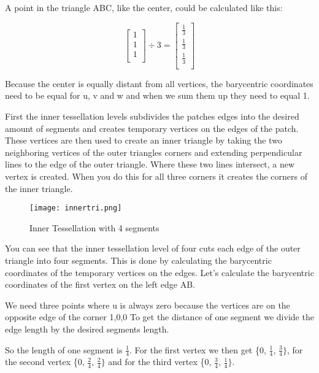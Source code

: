 \documentclass[12pt]{report} \usepackage{preamble}
\begin{document}
A point in the triangle ABC, like the center, could be calculated like this:

\[
	\begin{bmatrix}
		1 \\
		1 \\
		1 \\
	\end{bmatrix}
	\div
	3
	=
	\begin{bmatrix}
		\frac{1}{3} \\
		\frac{1}{3} \\
		\frac{1}{3} \\
	\end{bmatrix}
\]

Because the center is equally distant from all vertices,
the barycentric coordinates need to be equal for u, v and w
and when we sum them up they need to equal 1.

First the inner tessellation levels subdivides the patches edges into the desired amount of segments and
creates temporary vertices on the edges of the patch. These vertices are then used to create an
inner triangle by taking the two neighboring vertices of the outer triangles corners and extending perpendicular
lines to the edge of the outer triangle. Where these two lines intersect, a new vertex is created. When you
do this for all three corners it creates the corners of the inner triangle. \cite{tessellation}

\begin{figure}[hbtp]
	\centering \texttt{[image: innertri.png]}
	\caption{Inner Tessellation with 4 segments}
	\cite{fig:inner-tessellation}
\end{figure} \FloatBarrier

You can see that the inner tessellation level of four cuts each edge of the outer triangle into four segments.
This is done by calculating the barycentric coordinates of the temporary vertices on the edges. Let's
calculate the barycentric coordinates of the first vertex on the left edge AB.

We need three points where u is always zero because the vertices are on the opposite edge of the corner {1,0,0}
To get the distance of one segment we divide the edge length by the desired segments length.

So the length of one segment is \(\frac{1}{4}\).
For the first vertex we then get \{0, \(\frac{1}{4}\), \(\frac{3}{4}\}\), for the second
vertex \{0, \(\frac{2}{4}\), \(\frac{2}{4}\}\) and for the third vertex \{0, \(\frac{3}{4}\), \(\frac{1}{4}\}\).
\end{document}
